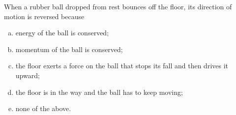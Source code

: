 \label{fnt7.2.1-6}

When a rubber ball dropped from rest bounces off the floor, its direction of motion is reversed because
\begin{enumerate}[(a)]
	\item energy of the ball is conserved;
	\item momentum of the ball is conserved;
	\item the floor exerts a force on the ball that stops its fall and then drives it upward;
	\item the floor is in the way and the ball has to keep moving;
	\item none of the above.
\end{enumerate}